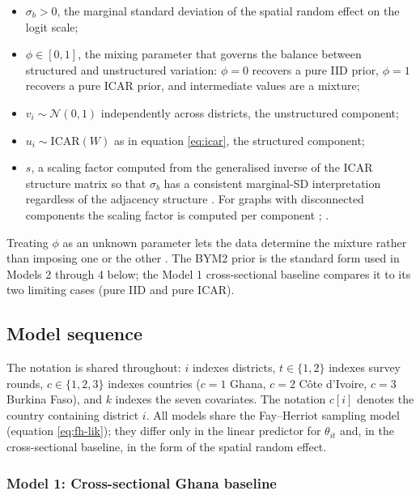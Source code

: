 \documentclass{article}
\begin{document}
\begin{itemize}
\item $\sigma_b > 0$, the marginal standard deviation of the spatial random effect on the logit scale;
\item $\phi \in [0, 1]$, the mixing parameter that governs the balance between structured and unstructured variation: $\phi = 0$ recovers a pure IID prior, $\phi = 1$ recovers a pure ICAR prior, and intermediate values are a mixture;
\item $v_i \sim \mathcal{N}(0, 1)$ independently across districts, the unstructured component;
\item $u_i \sim \mathrm{ICAR}(W)$ as in equation \ref{eq:icar}, the structured component;
\item $s$, a scaling factor computed from the generalised inverse of the ICAR structure matrix so that $\sigma_b$ has a consistent marginal-SD interpretation regardless of the adjacency structure \citep{riebler2016}. For graphs with disconnected components the scaling factor is computed per component \citep{freni2018}; \citep{donegan2021}.
\end{itemize}

Treating \(\phi\) as an unknown parameter lets the data determine the
mixture rather than imposing one or the other \citep{morris2019}. The
BYM2 prior is the standard form used in Models 2 through 4 below; the
Model 1 cross-sectional baseline compares it to its two limiting cases
(pure IID and pure ICAR).

\subsection{Model sequence}\label{model-sequence}

\label{sec:models}

The notation is shared throughout: \(i\) indexes districts,
\(t \in \{1, 2\}\) indexes survey rounds, \(c \in \{1, 2, 3\}\) indexes
countries (\(c = 1\) Ghana, \(c = 2\) Côte d'Ivoire, \(c = 3\) Burkina
Faso), and \(k\) indexes the seven covariates. The notation \(c[i]\)
denotes the country containing district \(i\). All models share the
Fay--Herriot sampling model (equation \ref{eq:fh-lik}); they differ only
in the linear predictor for \(\theta_{it}\) and, in the cross-sectional
baseline, in the form of the spatial random effect.

\subsubsection{Model 1: Cross-sectional Ghana
baseline}\label{model-1-cross-sectional-ghana-baseline}
\end{document}
